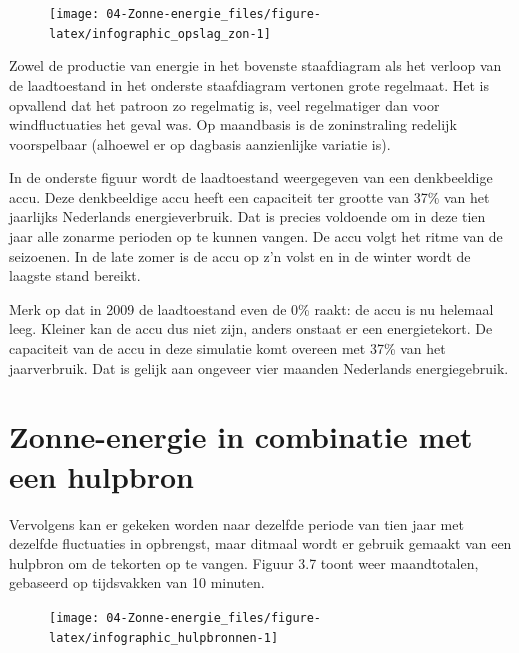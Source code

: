 \documentclass[
  11pt,
  a4paper,
]{book}
\begin{document}
\begin{figure}[t]

{\centering \texttt{[image: 04-Zonne-energie\_files/figure-latex/infographic\_opslag\_zon-1]} 

}

\end{figure}

Zowel de productie van energie in het bovenste staafdiagram als het verloop van de laadtoestand in het onderste staafdiagram vertonen grote regelmaat. Het is opvallend dat het patroon zo regelmatig is, veel regelmatiger dan voor windfluctuaties het geval was. Op maandbasis is de zoninstraling redelijk voorspelbaar (alhoewel er op dagbasis aanzienlijke variatie is).

In de onderste figuur wordt de laadtoestand weergegeven van een denkbeeldige accu. Deze denkbeeldige accu heeft een capaciteit ter grootte van 37\% van het jaarlijks Nederlands energieverbruik. Dat is precies voldoende om in deze tien jaar alle zonarme perioden op te kunnen vangen. De accu volgt het ritme van de seizoenen. In de late zomer is de accu op z'n volst en in de winter wordt de laagste stand bereikt.

Merk op dat in 2009 de laadtoestand even de 0\% raakt: de accu is nu helemaal leeg. Kleiner kan de accu dus niet zijn, anders onstaat er een energietekort. De capaciteit van de accu in deze simulatie komt overeen met 37\% van het jaarverbruik. Dat is gelijk aan ongeveer vier maanden Nederlands energiegebruik.

\hypertarget{zonne-energie-in-combinatie-met-een-hulpbron}{%
\section{Zonne-energie in combinatie met een hulpbron}\label{zonne-energie-in-combinatie-met-een-hulpbron}}

Vervolgens kan er gekeken worden naar dezelfde periode van tien jaar met dezelfde fluctuaties in opbrengst, maar ditmaal wordt er gebruik gemaakt van een hulpbron om de tekorten op te vangen. Figuur 3.7 toont weer maandtotalen, gebaseerd op tijdsvakken van 10 minuten.

\begin{figure}[!t]

{\centering \texttt{[image: 04-Zonne-energie\_files/figure-latex/infographic\_hulpbronnen-1]} 

}

\end{figure}
\end{document}
